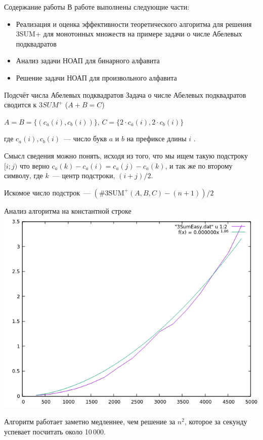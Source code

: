 \documentclass[hyperref=unicode,graphics=pdflatex,12pt]{beamer}
\begin{document}
\begin{frame}{Содержание работы}
\hspace{0.5cm}
В работе выполнены следующие части:
\begin{itemize}
\item<1-> Реализация и оценка эффективности теоретического алгоритма для решения 3SUM+
  для монотонных множеств на примере задачи о числе Абелевых подквадратов
\item<2-> Анализ задачи НОАП для бинарного алфавита
\item<3-> Решение задачи НОАП для произвольного алфавита
\end{itemize}
\end{frame}

\begin{frame}{Подсчёт числа Абелевых подквадратов}
Задача о числе Абелевых подквадратов сводится к $3SUM^+$ ($A + B = C$)
\vspace{0.5cm}

 $A = B = \{(c_a(i), c_b(i))\}$, $C = \{2 \cdot c_a(i), 2 \cdot c_b(i)\}$
\vspace{0.5cm}

где $c_a(i), c_b(i)$~--- число букв $a$ и $b$ на префиксе длины $i$
\vspace{0.5cm}.

Смысл сведения можно понять, исходя из того, что мы ищем такую подстроку $[i;j)$ что верно $c_a(k)-c_a(i)=c_a(j)-c_a(k)$, и так же по второму символу, где $k$~--- центр подстроки, $(i+j)/2$.

\vspace{0.5cm}

 Искомое число подстрок~--- $(\#3\text{SUM}^+(A, B, C) - (n + 1)) / 2$

\end{frame}

\begin{frame}{Анализ алгоритма на константной строке}
\includegraphics[scale=0.5]{pics/4.png}

Алгоритм работает заметно медленнее, чем решение за $n^2$, которое за секунду успевает посчитать около 10\,000.

\end{frame}
\end{document}
